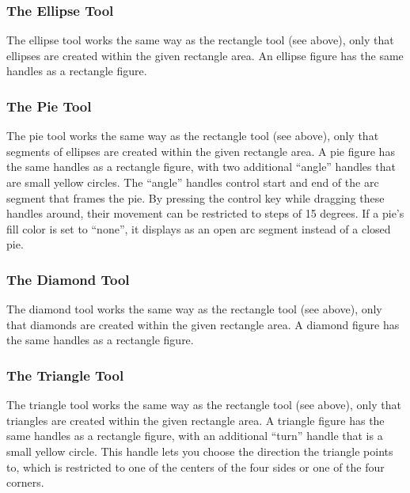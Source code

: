 \subsubsection{The Ellipse Tool}

The ellipse tool works the same way as the rectangle tool (see above),
only that ellipses are created within the given rectangle area.
An ellipse figure has the same handles as a rectangle figure.

\subsubsection{The Pie Tool}


The pie tool works the same way as the rectangle tool (see above),
only that segments of ellipses are created within the given rectangle area.
A pie figure has the same handles as a rectangle figure, with two
additional ``angle'' handles that are small yellow circles.
The ``angle'' handles control start and end of the arc segment that frames
the pie.
By pressing the control key while dragging these handles around, their
movement can be restricted to steps of 15 degrees.
If a pie's fill color is set to ``none'', it displays as an open arc
segment instead of a closed pie.

\subsubsection{The Diamond Tool}

The diamond tool works the same way as the rectangle tool (see above),
only that diamonds are created within the given rectangle area.
A diamond figure has the same handles as a rectangle figure.


\subsubsection{The Triangle Tool}

The triangle tool works the same way as the rectangle tool (see above),
only that triangles are created within the given rectangle area.
A triangle figure has the same handles as a rectangle figure, with an
additional ``turn'' handle that is a small yellow circle.
This handle lets you choose the direction the triangle points to, which
is restricted to one of the centers of the four sides or one of the four
corners.

